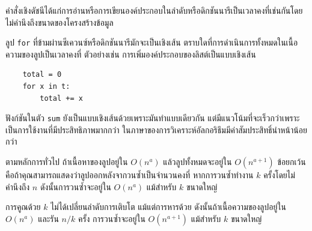 คำสั่งเชิงดัชนีได้แก่การอ่านหรือการเขียนองค์ประกอบในลำดับหรือดิกชันนารีเป็นเวลาคงที่เช่นกันโดยไม่คำนึงถึงขนาดของโครงสร้างข้อมูล


ลูป {\tt for} ที่ข้ามผ่านซีเควนซ์หรือดิกชันนารีมักจะเป็นเชิงเส้น 
ตราบใดที่การดำเนินการทั้งหมดในเนื้อความของลูปเป็นเวลาคงที่ 
ตัวอย่างเช่น การเพิ่มองค์ประกอบของลิสต์เป็นแบบเชิงเส้น

\begin{verbatim}
    total = 0
    for x in t:
        total += x
\end{verbatim}


ฟังก์ชันในตัว {\tt sum} ยังเป็นแบบเชิงเส้นด้วยเพราะมันทำแบบเดียวกัน แต่มีแนวโน้มที่จะเร็วกว่าเพราะเป็นการใช้งานที่มีประสิทธิภาพมากกว่า 
ในภาษาของการวิเคราะห์อัลกอริธึมมีค่าสัมประสิทธิ์นำหน้าน้อยกว่า



ตามหลักการทั่วไป ถ้าเนื้อหาของลูปอยู่ใน $O(n^a)$ แล้วลูปทั้งหมดจะอยู่ใน $O(n^{a+1})$ 
ข้อยกเว้นคือถ้าคุณสามารถแสดงว่าลูปออกหลังจากวนซ้ำเป็นจำนวนคงที่ 
หากการวนซ้ำทำงาน $k$ ครั้งโดยไม่คำนึงถึง $n$ ดังนั้นการวนซ้ำจะอยู่ใน $O(n^a)$ แม้สำหรับ $k$ ขนาดใหญ่



การคูณด้วย $k$ ไม่ได้เปลี่ยนลำดับการเติบโต แม้แต่การหารด้วย ดังนั้นถ้าเนื้อความของลูปอยู่ใน $O(n^a)$ และรัน $n/k$ ครั้ง 
การวนซ้ำจะอยู่ใน $O(n^{a+1})$ แม้สำหรับ $k$ ขนาดใหญ่



